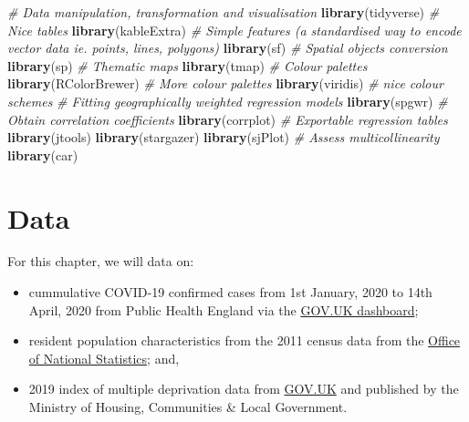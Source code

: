 \documentclass[]{book}
\newenvironment{Shaded}{\begin{snugshade}}{\end{snugshade}}
\newcommand{\KeywordTok}[1]{\textcolor[rgb]{0.13,0.29,0.53}{\textbf{#1}}}
\newcommand{\CommentTok}[1]{\textcolor[rgb]{0.56,0.35,0.01}{\textit{#1}}}
\newcommand{\NormalTok}[1]{#1}
\begin{document}
\begin{Shaded}
\begin{Highlighting}[]
\CommentTok{# Data manipulation, transformation and visualisation}
\KeywordTok{library}\NormalTok{(tidyverse)}
\CommentTok{# Nice tables}
\KeywordTok{library}\NormalTok{(kableExtra)}
\CommentTok{# Simple features (a standardised way to encode vector data ie. points, lines, polygons)}
\KeywordTok{library}\NormalTok{(sf) }
\CommentTok{# Spatial objects conversion}
\KeywordTok{library}\NormalTok{(sp) }
\CommentTok{# Thematic maps}
\KeywordTok{library}\NormalTok{(tmap) }
\CommentTok{# Colour palettes}
\KeywordTok{library}\NormalTok{(RColorBrewer) }
\CommentTok{# More colour palettes}
\KeywordTok{library}\NormalTok{(viridis) }\CommentTok{# nice colour schemes}
\CommentTok{# Fitting geographically weighted regression models}
\KeywordTok{library}\NormalTok{(spgwr)}
\CommentTok{# Obtain correlation coefficients}
\KeywordTok{library}\NormalTok{(corrplot)}
\CommentTok{# Exportable regression tables}
\KeywordTok{library}\NormalTok{(jtools)}
\KeywordTok{library}\NormalTok{(stargazer)}
\KeywordTok{library}\NormalTok{(sjPlot)}
\CommentTok{# Assess multicollinearity}
\KeywordTok{library}\NormalTok{(car)}
\end{Highlighting}
\end{Shaded}

\section{Data}\label{data-5}

For this chapter, we will data on:

\begin{itemize}
\item
  cummulative COVID-19 confirmed cases from 1st January, 2020 to 14th
  April, 2020 from Public Health England via the
  \href{https://coronavirus.data.gov.uk}{GOV.UK dashboard};
\item
  resident population characteristics from the 2011 census data from the
  \href{https://www.nomisweb.co.uk/home/census2001.asp}{Office of
  National Statistics}; and,
\item
  2019 index of multiple deprivation data from
  \href{https://www.gov.uk/government/statistics/english-indices-of-deprivation-2019}{GOV.UK}
  and published by the Ministry of Housing, Communities \& Local
  Government.
\end{itemize}
\end{document}
